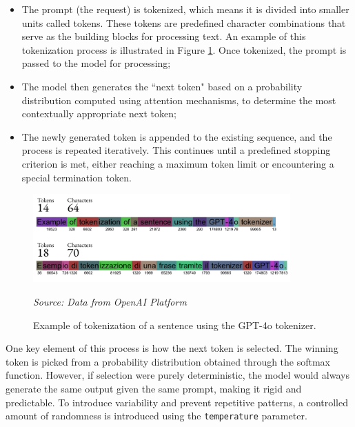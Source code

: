 \begin{itemize}
  \item The prompt (the request) is tokenized, which means it is divided into
    smaller units called tokens. These tokens are predefined character combinations
    that serve as the building blocks for processing text. An example of this
    tokenization process is illustrated in Figure \ref{fig:tokenization_example}.
    Once tokenized, the prompt is passed to the model for processing;

  \item The model then generates the ``next token" based on a probability
    distribution computed using attention mechanisms, to determine the most contextually
    appropriate next token;

  \item The newly generated token is appended to the existing sequence, and the
    process is repeated iteratively. This continues until a predefined stopping criterion
    is met, either reaching a maximum token limit or encountering a special
    termination token.
\end{itemize}

\begin{figure}[h!]
  \centering
  \includegraphics[width=0.88\textwidth]{
    images/experiment_setting/tokenization_example.png
  }
  \caption{Example of tokenization of a sentence using the GPT-4o tokenizer.}
  {\emph{Source: Data from OpenAI Platform}\footnotemark} \label{fig:tokenization_example}
\end{figure}

One key element of this process is how the next token is selected. The winning token
is picked from a probability distribution obtained through the softmax function.
However, if selection were purely deterministic, the model would always generate
the same output given the same prompt, making it rigid and predictable. To
introduce variability and prevent repetitive patterns, a controlled amount of randomness
is introduced using the \texttt{temperature} parameter.

